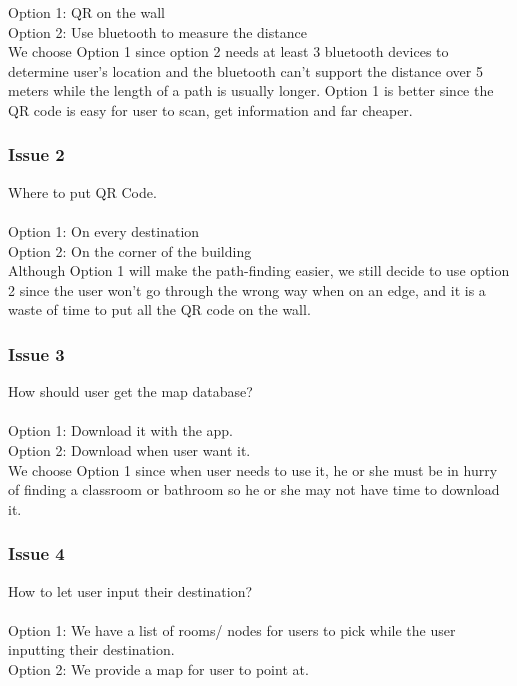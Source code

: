 \documentclass[12pt]{article}
\begin{document}
Option 1: QR on the wall \\
Option 2: Use bluetooth to measure the distance \\

We choose Option 1 since option 2 needs at least 3 bluetooth devices to determine user’s location and the bluetooth can’t support the distance over 5 meters while the length of a path is usually longer. Option 1 is better since the QR code is easy for user to scan, get information and far cheaper.

\subsubsection{Issue 2}

Where to put QR Code. \\ \\

Option 1: On every destination \\
Option 2: On the corner of the building \\

Although Option 1 will make the path-finding easier, we still decide to use option 2 since the user won’t go through the wrong way when on an edge, and it is a waste of time to put all the QR code on the wall.

\subsubsection{Issue 3}
How should user get the map database? \\ \\

Option 1: Download it with the app. \\
Option 2: Download when user want it. \\

We choose Option 1 since when user needs to use it, he or she must be in hurry of finding a classroom or bathroom so he or she may not have time to download it. 

\subsubsection{Issue 4}
How to let user input their destination? \\ \\
Option 1: We have a list of rooms/ nodes for users to pick while the user inputting their destination. \\
Option 2: We provide a map for user to point at. \\
\end{document}
